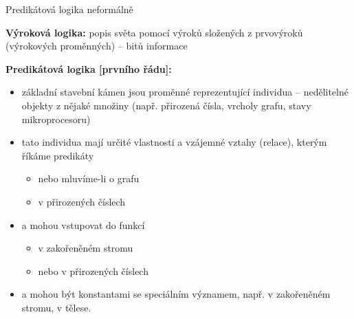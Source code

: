 \documentclass{beamer}
\begin{document}
\begin{frame}{Predikátová logika neformálně}

    \textbf{Výroková logika:} popis světa pomocí \alert{výroků} složených z \alert{prvovýroků} (\alert{výrokových proměnných}) -- bitů informace\pause
    
    \textbf{Predikátová logika [prvního řádu]:}\pause
    \begin{itemize}
        \item základní stavební kámen jsou \alert{proměnné} reprezentující \alert{individua} -- nedělitelné objekty z nějaké množiny (např. přirozená čísla, vrcholy grafu, stavy mikroprocesoru)\pause
        \item tato individua mají určité vlastnosti a vzájemné vztahy (\alert{relace}), kterým říkáme \alert{predikáty}\pause
        \begin{itemize}
            \item {}nebo  mluvíme-li o grafu\pause
            \item {} v přirozených číslech\pause
        \end{itemize}
        \item a mohou vstupovat do \alert{funkcí}\pause
        \begin{itemize}
            \item {} v zakořeněném stromu\pause
            \item {} nebo  v přirozených číslech\pause
        \end{itemize}
        \item a mohou být \alert{konstantami} se speciálním významem, např.  v zakořeněném stromu, 
             v tělese. 
    \end{itemize}    

\end{frame}
\end{document}

